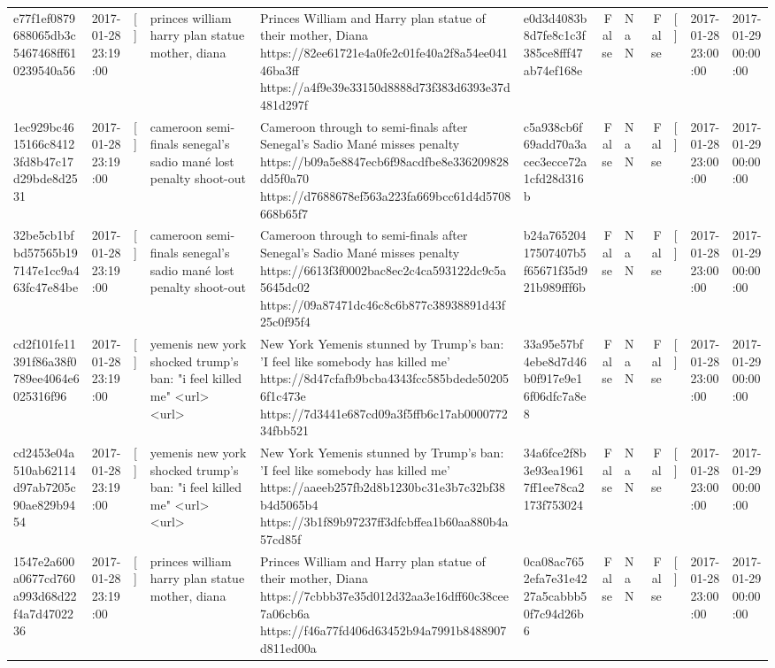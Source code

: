 \begin{tabular}{llllllrlrlll}
e77f1ef0879688065db3c5467468ff610239540a56 & 2017-01-28 23:19:00 & [] & princes william harry plan statue mother, diana & Princes William and Harry plan statue of their mother, Diana https://82ee61721e4a0fe2c01fe40a2f8a54ee04146ba3ff https://a4f9e39e33150d8888d73f383d6393e37d481d297f & e0d3d4083b8d7fe8c1c3f385ce8fff47ab74ef168e & False & NaN & False & [] & 2017-01-28 23:00:00 & 2017-01-29 00:00:00 \\
1ec929bc4615166c84123fd8b47c17d29bde8d2531 & 2017-01-28 23:19:00 & [] & cameroon semi-finals senegal's sadio mané lost penalty shoot-out & Cameroon through to semi-finals after Senegal’s Sadio Mané misses penalty https://b09a5e8847ecb6f98acdfbe8e336209828dd5f0a70 https://d7688678ef563a223fa669bcc61d4d5708668b65f7 & c5a938cb6f69add70a3acec3ecce72a1cfd28d316b & False & NaN & False & [] & 2017-01-28 23:00:00 & 2017-01-29 00:00:00 \\
32be5cb1bfbd57565b197147e1cc9a463fc47e84be & 2017-01-28 23:19:00 & [] & cameroon semi-finals senegal's sadio mané lost penalty shoot-out & Cameroon through to semi-finals after Senegal’s Sadio Mané misses penalty https://6613f3f0002bac8ec2c4ca593122dc9c5a5645dc02 https://09a87471dc46c8c6b877c38938891d43f25c0f95f4 & b24a76520417507407b5f65671f35d921b989fff6b & False & NaN & False & [] & 2017-01-28 23:00:00 & 2017-01-29 00:00:00 \\
cd2f101fe11391f86a38f0789ee4064e6025316f96 & 2017-01-28 23:19:00 & [] & yemenis new york shocked trump's ban: "i feel killed me" <url> <url> & New York Yemenis stunned by Trump's ban: 'I feel like somebody has killed me' https://8d47cfafb9bcba4343fcc585bdede502056f1c473e https://7d3441e687cd09a3f5ffb6c17ab000077234fbb521 & 33a95e57bf4ebe8d7d46b0f917e9e16f06dfc7a8e8 & False & NaN & False & [] & 2017-01-28 23:00:00 & 2017-01-29 00:00:00 \\
cd2453e04a510ab62114d97ab7205c90ae829b9454 & 2017-01-28 23:19:00 & [] & yemenis new york shocked trump's ban: "i feel killed me" <url> <url> & New York Yemenis stunned by Trump's ban: 'I feel like somebody has killed me' https://aaeeb257fb2d8b1230bc31e3b7c32bf38b4d5065b4 https://3b1f89b97237ff3dfcbffea1b60aa880b4a57cd85f & 34a6fce2f8b3e93ea19617ff1ee78ca2173f753024 & False & NaN & False & [] & 2017-01-28 23:00:00 & 2017-01-29 00:00:00 \\
1547e2a600a0677cd760a993d68d22f4a7d4702236 & 2017-01-28 23:19:00 & [] & princes william harry plan statue mother, diana & Princes William and Harry plan statue of their mother, Diana https://7cbbb37e35d012d32aa3e16dff60c38cee7a06cb6a https://f46a77fd406d63452b94a7991b8488907d811ed00a & 0ca08ac7652efa7e31e4227a5cabbb50f7c94d26b6 & False & NaN & False & [] & 2017-01-28 23:00:00 & 2017-01-29 00:00:00 \\

\end{tabular}
